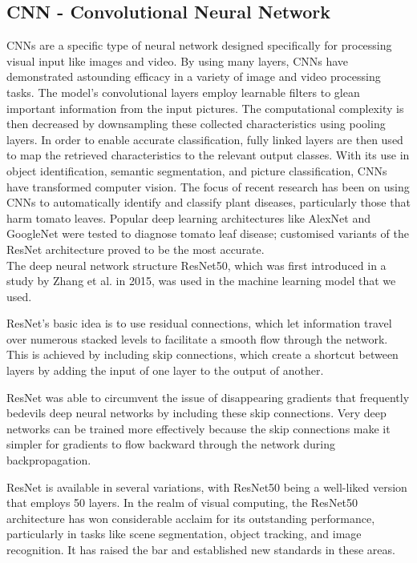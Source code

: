 \documentclass[conference]{IEEEtran}
\begin{document}
\subsection{CNN - Convolutional Neural Network}

CNNs are a specific type of neural network designed specifically for processing visual input like images and video. By using many layers, CNNs have demonstrated astounding efficacy in a variety of image and video processing tasks. The model's convolutional layers employ learnable filters to glean important information from the input pictures. The computational complexity is then decreased by downsampling these collected characteristics using pooling layers. In order to enable accurate classification, fully linked layers are then used to map the retrieved characteristics to the relevant output classes. With its use in object identification, semantic segmentation, and picture classification, CNNs have transformed computer vision. The focus of recent research has been on using CNNs to automatically identify and classify plant diseases, particularly those that harm tomato leaves. Popular deep learning architectures like AlexNet and GoogleNet were tested to diagnose tomato leaf disease; customised variants of the ResNet architecture proved to be the most accurate.\\

The deep neural network structure ResNet50, which was first introduced in a study by Zhang et al. \cite{Zhang_2021_WACV} in 2015, was used in the machine learning model that we used. 

ResNet's basic idea is to use residual connections, which let information travel over numerous stacked levels to facilitate a smooth flow through the network. This is achieved by including skip connections, which create a shortcut between layers by adding the input of one layer to the output of another.

ResNet was able to circumvent the issue of disappearing gradients that frequently bedevils deep neural networks by including these skip connections. Very deep networks can be trained more effectively because the skip connections make it simpler for gradients to flow backward through the network during backpropagation.

ResNet is available in several variations, with ResNet50 being a well-liked version that employs 50 layers. In the realm of visual computing, the ResNet50 architecture has won considerable acclaim for its outstanding performance, particularly in tasks like scene segmentation, object tracking, and image recognition. It has raised the bar and established new standards in these areas.
\end{document}

